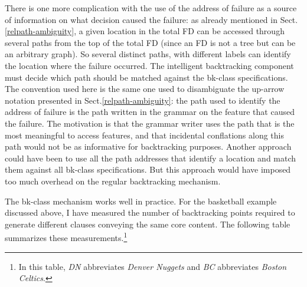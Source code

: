 \documentclass[10pt,a4paper]{report}
\begin{document}
There is one more complication with the use of the address of failure as a
source of information on what decision caused the failure: as already
mentioned in Sect.\ref{relpath-ambiguity}, a given location in the total FD
can be accessed through several paths from the top of the total FD (since
an FD is not a tree but can be an arbitrary graph).  So several distinct
paths, with different labels can identify the location where the failure
occurred.  The intelligent backtracking component must decide which path
should be matched against the bk-class specifications.  The convention used
here is the same one used to disambiguate the up-arrow notation presented
in Sect.\ref{relpath-ambiguity}: the path used to identify the address of
failure is the path written in the grammar on the feature that caused the
failure.  The motivation is that the grammar writer uses the path that is
the most meaningful to access features, and that incidental conflations
along this path would not be as informative for backtracking purposes.
Another approach could have been to use all the path addresses that
identify a location and match them against all bk-class specifications.
But this approach would have imposed too much overhead on the regular
backtracking mechanism.

The bk-class mechanism works well in practice.  For the basketball example
discussed above, I have measured the number of backtracking points required
to generate different clauses conveying the same core content.  The
following table summarizes these measurements.\footnote{In this table, {\em DN}
abbreviates {\em Denver Nuggets} and {\em BC} abbreviates
{\em Boston Celtics}.}
\end{document}
